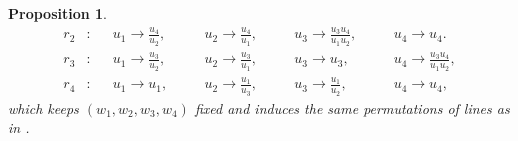 \documentclass[a4paper,reqno]{amsart}
\numberwithin{equation}{section}
\newcommand{\C}{\mathbb{C}}
\newtheorem{proposition}[theorem]{Proposition}
\numberwithin{equation}{section}
\begin{document}
\begin{proposition}
\begin{equation}
\begin{aligned}
    r_2 &: &&u_1\to \frac{u_4}{u_2}, \quad 
    &&u_2\to \frac{u_4}{u_1}, \quad 
    &&u_3\to \frac{u_3 u_4}{u_1 u_2}, \quad 
    &&u_4\to u_4. \\
    r_3 &: &&u_1\to \frac{u_3}{u_2}, \quad 
    &&u_2\to \frac{u_3}{u_1}, \quad 
    &&u_3 \to u_3, \quad 
    &&u_4\to \frac{u_3 u_4}{u_1 u_2}, \\
    r_4 &: &&u_1 \to u_1, \quad 
    &&u_2\to \frac{u_1}{u_3}, \quad 
    &&u_3\to \frac{u_1}{u_2}, \quad
    &&u_4 \to u_4,
\end{aligned}
\end{equation}
which keeps $(w_1,w_2,w_3,w_4)$ fixed and induces the same permutations of lines as in .
\end{proposition}
\end{document}
